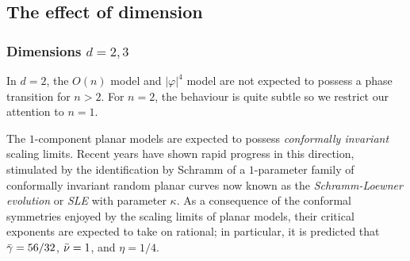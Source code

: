 
\subsection{The effect of dimension}

\subsubsection{Dimensions $d = 2, 3$}

In $d = 2$, the $O(n)$ model and $|\varphi|^4$ model are not expected to possess
a phase transition for $n > 2$. For $n = 2$, the behaviour is quite subtle so
we restrict our attention to $n = 1$.

The $1$-component planar models are
expected to possess \emph{conformally invariant} scaling limits. Recent years
have shown rapid progress in this direction, stimulated
by the identification by Schramm \cite{Schramm00} of a $1$-parameter family of
conformally invariant random planar curves now known as the \emph{Schramm-Loewner
evolution} or \emph{SLE} with parameter $\kappa$. 
As a consequence of the conformal symmetries enjoyed by the scaling limits of planar
models, their critical exponents are expected to take on rational; in particular,
it is predicted that $\bar\gamma = 56/32$, $\bar\nu = 1$, and $\eta = 1/4$.


